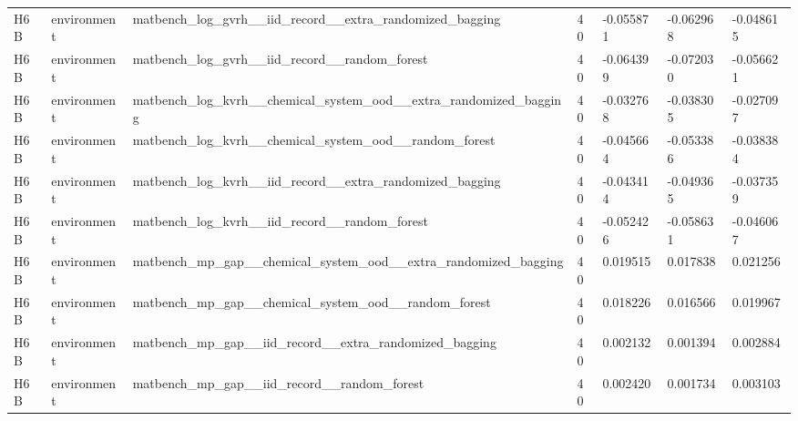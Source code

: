 \documentclass[10pt]{article}
\begin{document}
\begin{landscape}
\begin{longtable}{L{.35in}L{.6in}L{3.55in}L{.4in}L{.88in}L{.88in}L{.88in}}
H6B & environment & matbench\_\allowbreak{}log\_\allowbreak{}gvrh\_\allowbreak{}\_\allowbreak{}iid\_\allowbreak{}record\_\allowbreak{}\_\allowbreak{}extra\_\allowbreak{}randomized\_\allowbreak{}bagging & 40 & -0.055871 & -0.062968 & -0.048615\\
H6B & environment & matbench\_\allowbreak{}log\_\allowbreak{}gvrh\_\allowbreak{}\_\allowbreak{}iid\_\allowbreak{}record\_\allowbreak{}\_\allowbreak{}random\_\allowbreak{}forest & 40 & -0.064399 & -0.072030 & -0.056621\\
H6B & environment & matbench\_\allowbreak{}log\_\allowbreak{}kvrh\_\allowbreak{}\_\allowbreak{}chemical\_\allowbreak{}system\_\allowbreak{}ood\_\allowbreak{}\_\allowbreak{}extra\_\allowbreak{}randomized\_\allowbreak{}bagging & 40 & -0.032768 & -0.038305 & -0.027097\\
H6B & environment & matbench\_\allowbreak{}log\_\allowbreak{}kvrh\_\allowbreak{}\_\allowbreak{}chemical\_\allowbreak{}system\_\allowbreak{}ood\_\allowbreak{}\_\allowbreak{}random\_\allowbreak{}forest & 40 & -0.045664 & -0.053386 & -0.038384\\
H6B & environment & matbench\_\allowbreak{}log\_\allowbreak{}kvrh\_\allowbreak{}\_\allowbreak{}iid\_\allowbreak{}record\_\allowbreak{}\_\allowbreak{}extra\_\allowbreak{}randomized\_\allowbreak{}bagging & 40 & -0.043414 & -0.049365 & -0.037359\\
H6B & environment & matbench\_\allowbreak{}log\_\allowbreak{}kvrh\_\allowbreak{}\_\allowbreak{}iid\_\allowbreak{}record\_\allowbreak{}\_\allowbreak{}random\_\allowbreak{}forest & 40 & -0.052426 & -0.058631 & -0.046067\\
H6B & environment & matbench\_\allowbreak{}mp\_\allowbreak{}gap\_\allowbreak{}\_\allowbreak{}chemical\_\allowbreak{}system\_\allowbreak{}ood\_\allowbreak{}\_\allowbreak{}extra\_\allowbreak{}randomized\_\allowbreak{}bagging & 40 & 0.019515 & 0.017838 & 0.021256\\
H6B & environment & matbench\_\allowbreak{}mp\_\allowbreak{}gap\_\allowbreak{}\_\allowbreak{}chemical\_\allowbreak{}system\_\allowbreak{}ood\_\allowbreak{}\_\allowbreak{}random\_\allowbreak{}forest & 40 & 0.018226 & 0.016566 & 0.019967\\
H6B & environment & matbench\_\allowbreak{}mp\_\allowbreak{}gap\_\allowbreak{}\_\allowbreak{}iid\_\allowbreak{}record\_\allowbreak{}\_\allowbreak{}extra\_\allowbreak{}randomized\_\allowbreak{}bagging & 40 & 0.002132 & 0.001394 & 0.002884\\
H6B & environment & matbench\_\allowbreak{}mp\_\allowbreak{}gap\_\allowbreak{}\_\allowbreak{}iid\_\allowbreak{}record\_\allowbreak{}\_\allowbreak{}random\_\allowbreak{}forest & 40 & 0.002420 & 0.001734 & 0.003103\\

\end{longtable}
\end{landscape}
\end{document}
